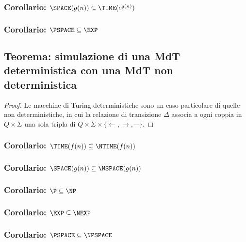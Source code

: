 \subsubsection{Corollario: $\SPACE(g(n)) \subseteq \TIME(c^{g(n)})$}
\subsubsection{Corollario: $\PSPACE \subseteq \EXP$}

\subsection{Teorema: simulazione di una MdT deterministica con una MdT non deterministica}
\label{theorem:deterministic_to_non_deterministic}
\begin{proof}
Le macchine di Turing deterministiche sono un caso particolare di quelle non deterministiche, in cui la relazione di transizione $\Delta$ associa a ogni coppia in $Q \times \Sigma$ una sola tripla di $Q \times \Sigma \times \{\leftarrow, \rightarrow, -\}$.
\end{proof}
\subsubsection{Corollario: $\TIME(f(n)) \subseteq \NTIME(f(n))$}
\subsubsection{Corollario: $\SPACE(g(n)) \subseteq \NSPACE(g(n))$}
\subsubsection{Corollario: $\P \subseteq \NP$}
\subsubsection{Corollario: $\EXP \subseteq \NEXP$}
\subsubsection{Corollario: $\PSPACE \subseteq \NPSPACE$}

